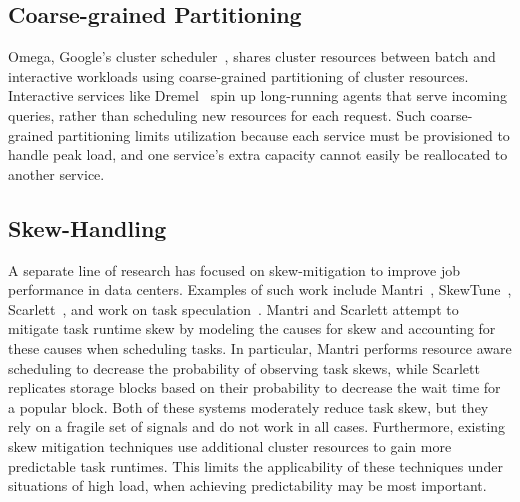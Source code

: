 \subsection{Coarse-grained Partitioning}
Omega, Google's cluster scheduler~\cite{wilkes2013omega},
shares cluster resources between batch and interactive workloads using
coarse-grained partitioning of cluster resources.
Interactive services like Dremel~\cite{melnik2010dremel} spin up long-running
agents that serve incoming queries, rather than scheduling new resources for
each request.  
Such coarse-grained partitioning limits utilization because each service
must be provisioned to handle peak load, and one service's extra capacity
cannot easily be reallocated to another service.

\subsection{Skew-Handling}
A separate line of research has focused on skew-mitigation to improve job
performance in data centers. Examples of such work include
Mantri~\cite{ananthanarayanan2010reining}, SkewTune~\cite{kwon2012skewtune},
Scarlett~\cite{ananthanarayanan2011scarlett}, and work on task
speculation~\cite{zaharia2008improving}. Mantri and Scarlett attempt to
mitigate task runtime skew by modeling the causes for skew and accounting for
these causes when scheduling tasks. In particular, Mantri performs resource aware scheduling to decrease the
probability of observing task skews, while Scarlett replicates storage blocks
based on their probability to decrease the wait time for a popular block. Both of these systems moderately reduce task skew, but they rely on a fragile set of
signals and do not work in all cases.
Furthermore, existing skew mitigation techniques use additional cluster resources to
gain more predictable task runtimes. This limits the applicability of these
techniques under situations of high load, when achieving predictability may be
most important.

